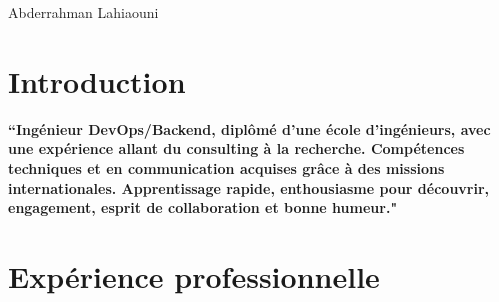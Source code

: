 \documentclass[10pt]{article} %
\begin{document}
\begin{paracol}{2} %


\parbox[top][0.03\textheight][c]{\linewidth}{ %
	\vspace{-0.02\textheight} %
	\centering %
	{\sffamily\Huge Abderrahman Lahiaouni}\\\medskip %
}




\section{Introduction}

{\raggedright\textbf{``Ingénieur DevOps/Backend, diplômé d'une école d'ingénieurs, avec une expérience allant du consulting à la recherche. Compétences techniques et en communication acquises grâce à des missions internationales. Apprentissage rapide, enthousiasme pour découvrir, engagement, esprit de collaboration et bonne humeur."} \medskip}


\medskip %


\section{Expérience professionnelle}




\end{paracol}
\end{document}
